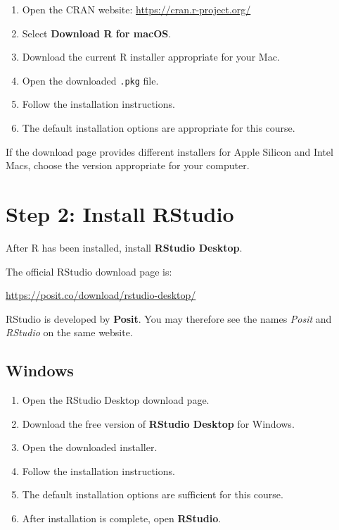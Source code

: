 \documentclass[11pt]{article}
\begin{document}
\begin{enumerate}
    \item Open the CRAN website: \url{https://cran.r-project.org/}
    \item Select \textbf{Download R for macOS}.
    \item Download the current R installer appropriate for your Mac.
    \item Open the downloaded \texttt{.pkg} file.
    \item Follow the installation instructions.
    \item The default installation options are appropriate for this course.
\end{enumerate}

If the download page provides different installers for Apple Silicon and Intel Macs, choose the version appropriate for your computer.


\section{Step 2: Install RStudio}

After R has been installed, install \textbf{RStudio Desktop}.

The official RStudio download page is:

\begin{center}
\url{https://posit.co/download/rstudio-desktop/}
\end{center}

RStudio is developed by \textbf{Posit}. You may therefore see the names \emph{Posit} and \emph{RStudio} on the same website.

\subsection{Windows}

\begin{enumerate}
    \item Open the RStudio Desktop download page.
    \item Download the free version of \textbf{RStudio Desktop} for Windows.
    \item Open the downloaded installer.
    \item Follow the installation instructions.
    \item The default installation options are sufficient for this course.
    \item After installation is complete, open \textbf{RStudio}.

\end{enumerate}
\end{document}
